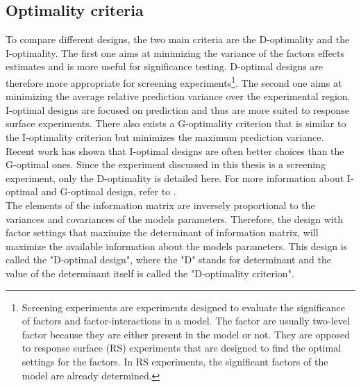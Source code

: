 \subsection{Optimality criteria}
To compare different designs, the two main criteria are the D-optimality and the I-optimality. 
The first one aims at minimizing the variance of the factors effects estimates and is more useful for significance testing. 
D-optimal designs are therefore more appropriate for screening experiments\footnote{Screening experiments are experiments designed to evaluate the significance of factors and factor-interactions in a model. The factor are usually two-level factor because they are either present in the model or not. They are opposed to response surface (RS) experiments that are designed to find the optimal settings for the factors. In RS experiments, the significant factors of the model are already determined.}. 
The second one aims at minimizing the average relative prediction variance over the experimental region. 
I-optimal designs are focused on prediction and thus are more suited to response surface experiments.
There also exists a G-optimality criterion that is similar to the I-optimality criterion but minimizes the maximum prediction 
variance. 
Recent work \parencite{rodriguez_generating_2010} has shown that I-optimal designs are often better choices than the G-optimal 
ones. 
Since the experiment discussed in this thesis is a screening experiment, only the D-optimality is detailed here. 
For more information about I-optimal and G-optimal design, refer to \textcite{goos_optimal_2011,atkinson2014optimal}.\\

The elements of the information matrix are inversely proportional to the variances and covariances of the models parameters.
Therefore, the design with factor settings that maximize the determinant of information matrix, 
will maximize the available information about the models parameters. 
This design is called the "D-optimal design", 
where the "D" stands for determinant and the value of the determinant itself is called the "D-optimality criterion".\\

